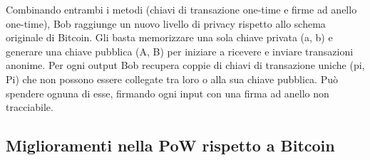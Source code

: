\documentclass[
]{article}
\begin{document}
Combinando entrambi i metodi (chiavi di transazione one-time e firme ad
anello one-time), Bob raggiunge un nuovo livello di privacy rispetto
allo schema originale di Bitcoin. Gli basta memorizzare una sola chiave
privata (a, b) e generare una chiave pubblica (A, B) per iniziare a
ricevere e inviare transazioni anonime. Per ogni output Bob recupera
coppie di chiavi di transazione uniche (pi, Pi) che non possono essere
collegate tra loro o alla sua chiave pubblica. Può spendere ognuna di
esse, firmando ogni input con una firma ad anello non tracciabile.

\subsection{Miglioramenti nella PoW rispetto a
Bitcoin}\label{miglioramenti-nella-pow-rispetto-a-bitcoin}
\end{document}
